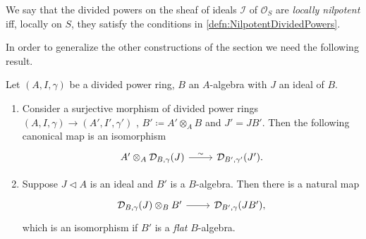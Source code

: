 \begin{defn}
	We say that the divided powers on the sheaf of ideals $\mathcal{I}$
	of $\mathcal{O}_{ S }$ are {\em locally nilpotent} iff,
	locally on $S$, they satisfy the conditions in \cref{defn:NilpotentDividedPowers}.
\end{defn}


\noindent
In order to generalize the other constructions of the section
we need the following result.


\begin{prop}\label{prop:PDEnvScheme}
	Let $\left(A, I, \gamma\right)$ be a divided power ring, $B$
	an $A$-algebra with $J$ an ideal of $B$.
\begin{enumerate}
	\item Consider a surjective morphism of divided power rings
		$\left(A, I, \gamma\right) \to  \left(A', I', \gamma'\right)$ ,
		$B' \coloneqq A' \otimes_A B$ and $J' = JB'$.
		Then the following canonical map is an isomorphism
		\begin{equation*}
		\begin{tikzcd}[row sep = 0ex
			,/tikz/column 1/.append style={anchor=base east}
			,/tikz/column 2/.append style={anchor=base west}]
			A' \otimes_A \mathcal{D}_{B,\gamma}(J) \arrow[r, "\sim", rightarrow] &
			\mathcal{D}_{B',\gamma'}(J')
		.\end{tikzcd}
		\end{equation*} 

	\item Suppose $J \triangleleft A$ is an ideal and $B'$ is a $B$-algebra.
		Then there is a natural map
		\begin{equation*}
		\begin{tikzcd}[row sep = 0ex
			,/tikz/column 1/.append style={anchor=base east}
			,/tikz/column 2/.append style={anchor=base west}]
			\mathcal{D}_{B,\gamma}(J) \otimes_B B' \arrow[r, "", rightarrow] &
			\mathcal{D}_{B',\gamma}(JB')
		,\end{tikzcd}
		\end{equation*} 
		which is an isomorphism if $B'$ is a {\em flat} $B$-algebra.
\end{enumerate}
\end{prop}


